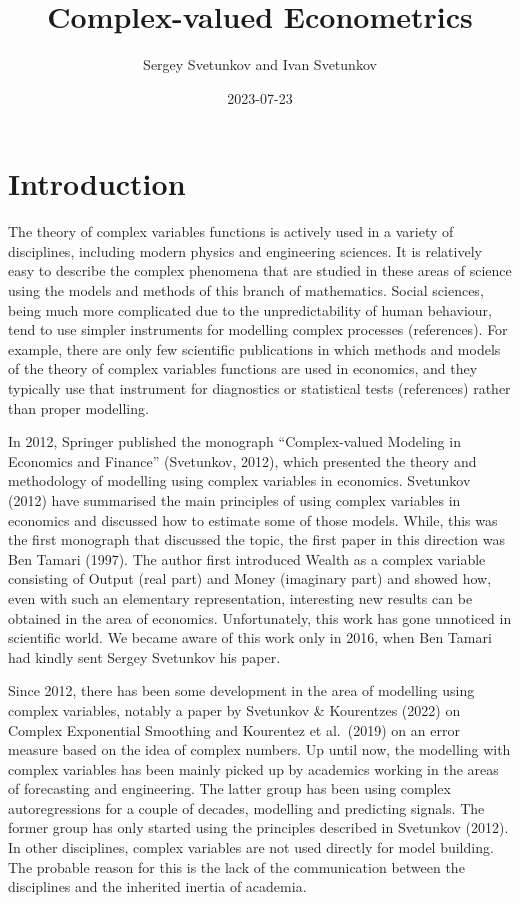 \documentclass[
]{book}
\title{Complex-valued Econometrics}
\author{Sergey Svetunkov and Ivan Svetunkov}
\date{2023-07-23}
\begin{document}
\maketitle

{
\setcounter{tocdepth}{1}
\tableofcontents
}
\hypertarget{introduction}{%
\chapter*{Introduction}\label{introduction}}

The theory of complex variables functions is actively used in a variety of disciplines, including modern physics and engineering sciences. It is relatively easy to describe the complex phenomena that are studied in these areas of science using the models and methods of this branch of mathematics. Social sciences, being much more complicated due to the unpredictability of human behaviour, tend to use simpler instruments for modelling complex processes (references). For example, there are only few scientific publications in which methods and models of the theory of complex variables functions are used in economics, and they typically use that instrument for diagnostics or statistical tests (references) rather than proper modelling.

In 2012, Springer published the monograph ``Complex-valued Modeling in Economics and Finance'' (Svetunkov, 2012), which presented the theory and methodology of modelling using complex variables in economics. Svetunkov (2012) have summarised the main principles of using complex variables in economics and discussed how to estimate some of those models. While, this was the first monograph that discussed the topic, the first paper in this direction was Ben Tamari (1997). The author first introduced Wealth as a complex variable consisting of Output (real part) and Money (imaginary part) and showed how, even with such an elementary representation, interesting new results can be obtained in the area of economics. Unfortunately, this work has gone unnoticed in scientific world. We became aware of this work only in 2016, when Ben Tamari had kindly sent Sergey Svetunkov his paper.

Since 2012, there has been some development in the area of modelling using complex variables, notably a paper by Svetunkov \& Kourentzes (2022) on Complex Exponential Smoothing and Kourentez et al.~(2019) on an error measure based on the idea of complex numbers. Up until now, the modelling with complex variables has been mainly picked up by academics working in the areas of forecasting and engineering. The latter group has been using complex autoregressions for a couple of decades, modelling and predicting signals. The former group has only started using the principles described in Svetunkov (2012). In other disciplines, complex variables are not used directly for model building. The probable reason for this is the lack of the communication between the disciplines and the inherited inertia of academia.
\end{document}

